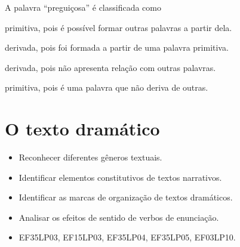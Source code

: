 A palavra ``preguiçosa'' é classificada como

\begin{escolha}
\item primitiva, pois é possível formar outras palavras a partir dela.

\item derivada, pois foi formada a partir de uma palavra primitiva.

\item derivada, pois não apresenta relação com outras palavras.

\item primitiva, pois é uma palavra que não deriva de outras.
\end{escolha}


\chapter{O texto dramático}



\begin{itemize}
  \item Reconhecer diferentes gêneros textuais.
  \item Identificar elementos constitutivos de textos narrativos.
  \item Identificar as marcas de organização de textos dramáticos.
  \item Analisar os efeitos de sentido de verbos de enunciação.
\end{itemize}


\begin{itemize}
  \item EF35LP03, EF15LP03, EF35LP04, EF35LP05, EF03LP10.
\end{itemize}

